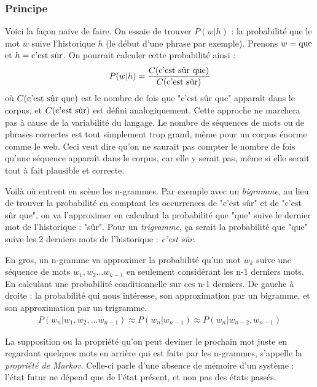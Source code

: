 \documentclass[11pt, a4paper]{report}
\begin{document}
  \subsubsection{Principe}
  Voici la façon naïve de faire. On essaie de trouver $P(w|h)$ : la probabilité que le mot 
  $w$ suive l'historique $h$ (le début d'une phrase par exemple). Prenons $w = \textup{que}$ et 
  $h = \textup{c'est sûr}$. On pourrait calculer cette probabilité ainsi : 
  \begin{align}
    P(w|h) = \frac{C(\textup{c'est sûr que})}{C(\textup{c'est sûr})}
  \end{align}
  où $C(\textup{c'est sûr que})$ est le nombre de fois que "c'est sûr que" apparaît 
  dans le corpus, et $C(\textup{c'est sûr})$ est défini analogiquement. Cette approche 
  ne marchera pas à cause de la variabilité du langage. Le nombre de séquences de mots
  ou de phrases  
  correctes est tout simplement trop grand, même pour un corpus énorme comme le web.
  Ceci veut dire qu'on ne saurait pas compter le nombre de fois qu'une séquence apparaît
  dans le corpus, car elle y serait pas, même si elle serait tout à fait plausible et 
  correcte. 

  Voilà où entrent en scène les n-grammes. Par exemple avec un \textit{bigramme}, 
  au lieu de trouver la probabilité en comptant les occurrences de 
  "c'est sûr" et de "c'est sûr que", on va l'approximer en calculant la probabilité que "que" suive 
  le dernier mot de l'historique : "sûr". Pour un \textit{trigramme}, ça serait 
  la probabilité que "que" suive les 2 derniers mots de l'historique : \textit{c'est sûr}.
  
  En gros, un n-gramme va approximer la probabilité qu'un mot $w_k$ suive une séquence 
  de mots $w_{1}, w_{2} \dots w_{k-1}$ en seulement considérant les n-1 derniers mots. 
  En calculant une probabilité conditionnelle sur ces n-1 derniers. 
  De gauche à droite : la probabilité qui nous intéresse, son approximation par un bigramme, 
  et son approximation par un trigramme. 
  \begin{align}
    P(w_n|w_1, w_2, \dots w_{n-1}) \approx P(w_n|w_{n-1}) \approx P(w_n|w_{n-2}, w_{n-1})
  \end{align}

  La supposition ou la propriété qu'on peut deviner le prochain mot juste en regardant quelques mots en arrière 
  qui est faite par les n-grammes, s'appelle la \textit{propriété de Markov}. Celle-ci parle 
  d'une absence de mémoire d'un système : l'état futur ne dépend que de l'état présent, et 
  non pas des états passés. 
\end{document}
